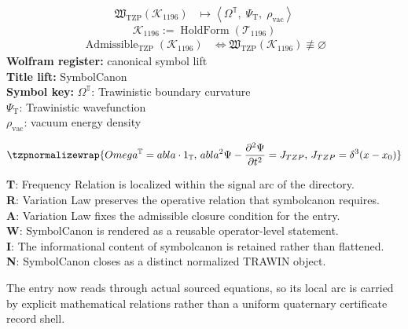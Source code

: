 \noindent
\begin{minipage}[t]{0.48\linewidth}
\begingroup
\small
\[
\begin{aligned}
\mathfrak{W}_{\mathrm{TZP}}\!\left(\mathcal{K}_{1196}\right)
&\longmapsto
\left\langle \Omega^{\mathbb{T}},\; \Psi_{\mathrm{T}},\; \rho_{\mathrm{vac}} \right\rangle
\end{aligned}
\]
\[
\mathcal{K}_{1196}
:=
\operatorname{HoldForm}\!\left(\mathcal{T}_{1196}\right)
\]
\[
\begin{aligned}
\operatorname{Admissible}_{\mathrm{TZP}}\!\left(\mathcal{K}_{1196}\right)
&\Longleftrightarrow
\mathfrak{W}_{\mathrm{TZP}}\!\left(\mathcal{K}_{1196}\right)\not\equiv\varnothing
\end{aligned}
\]
\textbf{Wolfram register:} canonical symbol lift\\
\textbf{Title lift:} SymbolCanon\\
\textbf{Symbol key:} \(\Omega^{\mathbb{T}}\): Trawinistic boundary curvature\\ \(\Psi_{\mathrm{T}}\): Trawinistic wavefunction\\ \(\rho_{\mathrm{vac}}\): vacuum energy density
\par
\endgroup
\end{minipage}\hfill
\begin{minipage}[t]{0.48\linewidth}
\[
\tzpnormalizewrap{Omega^{\mathbb{T}}= abla\cdot1_{\mathbb{T}},\,abla^{2}\Psi-\frac{\partial^{2}\Psi}{\partial t^{2}}=J_{TZP},\,J_{TZP}=\delta^{3}(x-x_{0})}
\]

\small
\textbf{T}: Frequency Relation is localized within the signal arc of the directory.\\
\textbf{R}: Variation Law preserves the operative relation that symbolcanon requires.\\
\textbf{A}: Variation Law fixes the admissible closure condition for the entry.\\
\textbf{W}: SymbolCanon is rendered as a reusable operator-level statement.\\
\textbf{I}: The informational content of symbolcanon is retained rather than flattened.\\
\textbf{N}: SymbolCanon closes as a distinct normalized TRAWIN object.
\normalsize
\end{minipage}

The entry now reads through actual sourced equations, so its local arc is carried by explicit mathematical relations rather than a uniform quaternary certificate record shell.
\clearpage

